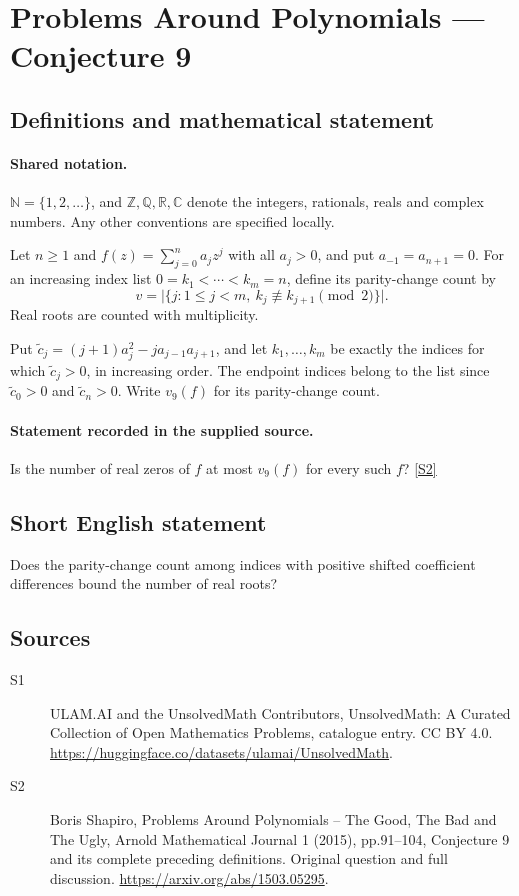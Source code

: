 \documentclass[11pt]{article}
\newcommand{\sref}[2]{\hyperlink{source:#1:#2}{[S#2]}}
\begin{document}
\section{Problems Around Polynomials — Conjecture 9}\label{statement}

\subsection{Definitions and mathematical statement}

\paragraph{Shared notation.}$\mathbb N=\{1,2,\ldots\}$, and $\mathbb Z,\mathbb Q,\mathbb R,\mathbb C$ denote the integers, rationals, reals and complex numbers. Any other conventions are specified locally.


Let $n\geq1$ and $f(z)=\sum_{j=0}^n a_jz^j$ with all $a_j>0$, and put $a_{-1}=a_{n+1}=0$. For an increasing index list $0=k_1<\cdots<k_m=n$, define its parity-change count by
\[v=\bigl|\{j:1\leq j<m,\ k_j\not\equiv k_{j+1}\pmod2\}\bigr|.\]
Real roots are counted with multiplicity.\par Put $\widetilde c_j=(j+1)a_j^2-ja_{j-1}a_{j+1}$, and let $k_1,\ldots,k_m$ be exactly the indices for which $\widetilde c_j>0$, in increasing order. The endpoint indices belong to the list since $\widetilde c_0>0$ and $\widetilde c_n>0$. Write $v_9(f)$ for its parity-change count.
\paragraph{Statement recorded in the supplied source.}
Is the number of real zeros of $f$ at most $v_9(f)$ for every such $f$? \sref{statement}{2}
\subsection{Short English statement}
Does the parity-change count among indices with positive shifted coefficient differences bound the number of real roots?
\subsection{Sources}
\begin{description}
\item[\hypertarget{source:statement:1}{S1}] ULAM.AI and the UnsolvedMath Contributors, UnsolvedMath: A Curated Collection of Open Mathematics Problems, catalogue entry. CC BY 4.0. \url{https://huggingface.co/datasets/ulamai/UnsolvedMath}.
\item[\hypertarget{source:statement:2}{S2}] Boris Shapiro, Problems Around Polynomials -- The Good, The Bad and The Ugly, Arnold Mathematical Journal 1 (2015), pp.91--104, Conjecture 9 and its complete preceding definitions. Original question and full discussion. \url{https://arxiv.org/abs/1503.05295}.

\end{description}
\label{end:statement}
\end{document}
